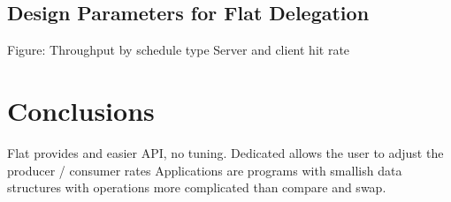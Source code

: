 \documentclass{uicthesi}
\begin{document}
\section{Design Parameters for Flat Delegation}

Figure: Throughput by schedule type
	Server and client hit rate

\chapter{Conclusions}
Flat provides and easier API, no tuning. 
Dedicated allows the user to adjust the producer / consumer rates
Applications are programs with smallish data structures with operations more complicated than compare and swap. 
\end{document}
